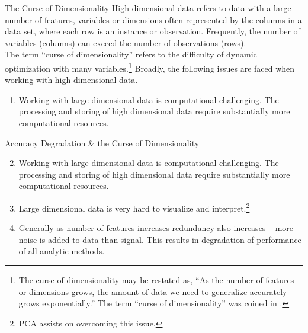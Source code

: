 \documentclass[pdf]{beamer}
\theoremstyle{remark}
\theoremstyle{definition}
\begin{document}
\begin{frame}[t]{The Curse of Dimensionality}
High dimensional data refers to data with a large number of features, variables or dimensions often represented by the columns in a data set, where each row is an instance or observation. Frequently, the number of variables (columns) can exceed the number of observations (rows).\\
\vspace{1.5ex}
The term ``curse of dimensionality'' refers to the difficulty of dynamic optimization with many variables.\footnote{The curse of dimensionality may be restated as, ``As the number of features or dimensions grows, the amount of data we need to generalize accurately grows exponentially.'' The term ``curse of dimensionality'' was coined in \cite{bellman1957}.} Broadly, the following issues are faced when working with high dimensional data.
\begin{enumerate}
  \item Working with large dimensional data is computational challenging. The processing and storing of high dimensional data require substantially more computational resources. 
\end{enumerate}
\end{frame}

\begin{frame}[t]{Accuracy Degradation \& the Curse of Dimensionality}
\begin{enumerate}
  \setcounter{enumi}{1}
  \item Working with large dimensional data is computational challenging. The processing and storing of high dimensional data require substantially more computational resources. 
  \item Large dimensional data is very hard to visualize and interpret.\footnote{PCA assists on overcoming this issue.}
  \item Generally as number of features increases redundancy also increases -- more noise is added to data than signal. This results in degradation of performance of all analytic methods. 
\end{enumerate}
\end{frame}
\end{document}
